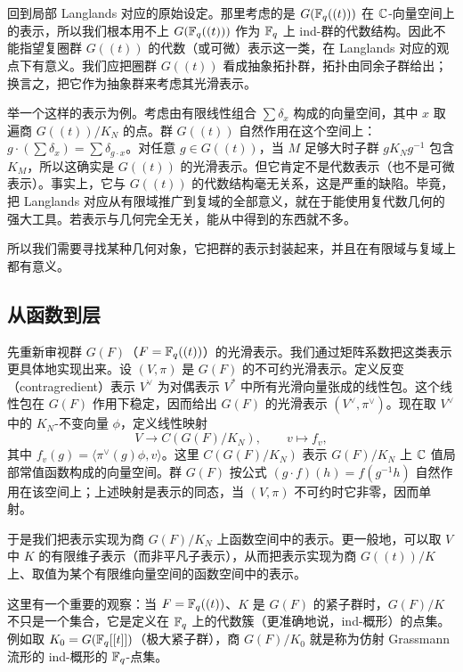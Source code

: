 回到局部 Langlands 对应的原始设定。那里考虑的是 $G(\mathbb{F}_q((t)))$ 在 $\mathbb{C}$-向量空间上的表示，所以我们根本用不上 $G(\mathbb{F}_q((t)))$ 作为 $\mathbb{F}_q$ 上 ind-群的代数结构。因此不能指望复圈群 $G((t))$ 的代数（或可微）表示这一类，在 Langlands 对应的观点下有意义。我们应把圈群 $G((t))$ 看成抽象拓扑群，拓扑由同余子群给出；换言之，把它作为抽象群来考虑其光滑表示。

举一个这样的表示为例。考虑由有限线性组合 $\sum\delta_x$ 构成的向量空间，其中 $x$ 取遍商 $G((t))/K_N$ 的点。群 $G((t))$ 自然作用在这个空间上：$g\cdot(\sum\delta_x)=\sum\delta_{g\cdot x}$。对任意 $g\in G((t))$，当 $M$ 足够大时子群 $gK_Ng^{-1}$ 包含 $K_M$，所以这确实是 $G((t))$ 的光滑表示。但它肯定不是代数表示（也不是可微表示）。事实上，它与 $G((t))$ 的代数结构毫无关系，这是严重的缺陷。毕竟，把 Langlands 对应从有限域推广到复域的全部意义，就在于能使用复代数几何的强大工具。若表示与几何完全无关，能从中得到的东西就不多。

所以我们需要寻找某种几何对象，它把群的表示封装起来，并且在有限域与复域上都有意义。

\subsection{从函数到层}

先重新审视群 $G(F)$（$F=\mathbb{F}_q((t))$）的光滑表示。我们通过矩阵系数把这类表示更具体地实现出来。设 $(V,\pi)$ 是 $G(F)$ 的不可约光滑表示。定义反变（contragredient）表示 $V^\vee$ 为对偶表示 $V^*$ 中所有光滑向量张成的线性包。这个线性包在 $G(F)$ 作用下稳定，因而给出 $G(F)$ 的光滑表示 $(V^\vee,\pi^\vee)$。现在取 $V^\vee$ 中的 $K_N$-不变向量 $\phi$，定义线性映射
\[
    V\longrightarrow C(G(F)/K_N),\qquad v\longmapsto f_v,
\]
其中 $f_v(g)=\langle\pi^\vee(g)\phi,v\rangle$。这里 $C(G(F)/K_N)$ 表示 $G(F)/K_N$ 上 $\mathbb{C}$ 值局部常值函数构成的向量空间。群 $G(F)$ 按公式 $(g\cdot f)(h)=f(g^{-1}h)$ 自然作用在该空间上；上述映射是表示的同态，当 $(V,\pi)$ 不可约时它非零，因而单射。

于是我们把表示实现为商 $G(F)/K_N$ 上函数空间中的表示。更一般地，可以取 $V$ 中 $K$ 的有限维子表示（而非平凡子表示），从而把表示实现为商 $G((t))/K$ 上、取值为某个有限维向量空间的函数空间中的表示。

这里有一个重要的观察：当 $F=\mathbb{F}_q((t))$、$K$ 是 $G(F)$ 的紧子群时，$G(F)/K$ 不只是一个集合，它是定义在 $\mathbb{F}_q$ 上的代数簇（更准确地说，ind-概形）的点集。例如取 $K_0=G(\mathbb{F}_q[[t]])$（极大紧子群），商 $G(F)/K_0$ 就是称为仿射 Grassmann 流形的 ind-概形的 $\mathbb{F}_q$-点集。

